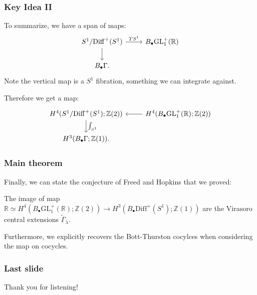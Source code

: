 \documentclass{beamer}
\newcommand{\Z}{\mathbb Z}
\newcommand{\R}{\mathbb R}
\newcommand{\GL}{\mathrm{GL}}
\newcommand{\Bdot}{B_\bullet}
\newcommand{\Diff}{\mathrm{Diff}^+(S^1)}
\newcommand{\tGam}{\widetilde\Gamma}
\begin{document}
\begin{frame}[fragile]
    \frametitle{Key Idea II}
    To summarize, we have a span of maps:
    \begin{equation}
        \begin{tikzcd}
        S^1/\Diff \arrow[r, "TS^1"] \arrow[d]
        & \Bdot\GL^+_1(\R) \\
        \Bdot\Gamma.
        & 
        \end{tikzcd}
        \end{equation}
    Note the vertical map is a $S^1$ fibration, something we can integrate against. 

    Therefore we get a map:
    \begin{equation}
        \begin{tikzcd}
        H^4(S^1/\Diff; \Z(2))  \arrow[d, "\int_{S^1}"]
        & H^4(\Bdot \GL^+_1(\R); \Z(2)) \arrow[l]\\
        H^3(\Bdot\Gamma; \Z(1)).
        & 
        \end{tikzcd}
        \end{equation} 
\end{frame}

\begin{frame}
    \frametitle{Main theorem}
    Finally, we can state the conjecture of Freed and Hopkins that we proved: \vspace{5mm}
    \begin{theorem}
        The image of map $\R \simeq H^4(\Bdot \GL^+_1(\R); \Z(2)) \to H^3(\Bdot\Diff; \Z(1))$
        are the Virasoro central extensions $\tGam_\lambda$.
    \end{theorem}

    \vspace{5mm} Furthermore, we explicitly recovers the Bott-Thurston cocylces when considering the 
    map on cocycles.
\end{frame}

\begin{frame}
    \frametitle{Last slide}
    \huge Thank you for listening!
\end{frame}


\end{document}
